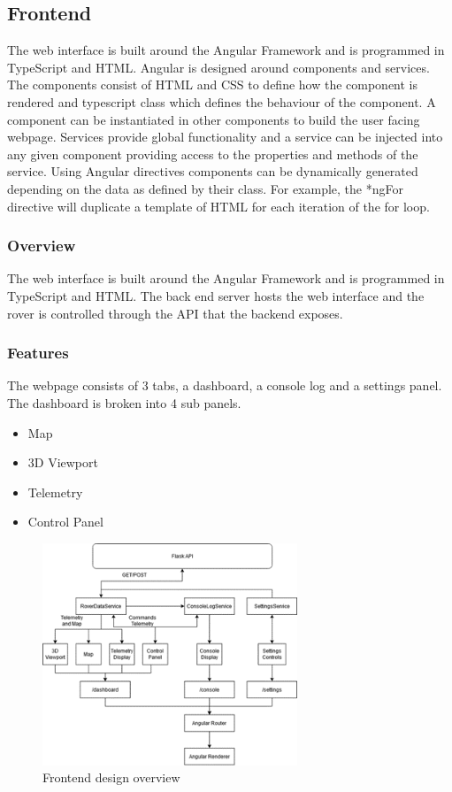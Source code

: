 
\subsection{Frontend}

The web interface is built around the Angular Framework and is programmed in TypeScript and HTML.
Angular is designed around components and services. 
The components consist of HTML and CSS to define how the component is rendered and typescript class which defines the behaviour of the component. 
A component can be instantiated in other components to build the user facing webpage. 
Services provide global functionality and a service can be injected into any given component providing access to the properties and methods of the service. 
Using Angular directives components can be dynamically generated depending on the data as defined by their class. 
For example, the *ngFor directive will duplicate a template of HTML for each iteration of the for loop.

\subsubsection*{Overview}
The web interface is built around the Angular Framework and is programmed in TypeScript 
and HTML. The back end server hosts the web interface and the rover is controlled through the API
that the backend exposes.

\subsubsection*{Features}
The webpage consists of 3 tabs, a dashboard, a console log and a settings panel. 
The dashboard is broken into 4 sub panels.
\begin{itemize}
    \item Map
    \item 3D Viewport
    \item Telemetry
    \item Control Panel
\end{itemize}

\newpage
\begin{figure}
    \centerline{\includegraphics[width=0.68\textwidth]{images/frontend-flow.png}}
    \caption{Frontend design overview}
\end{figure}

